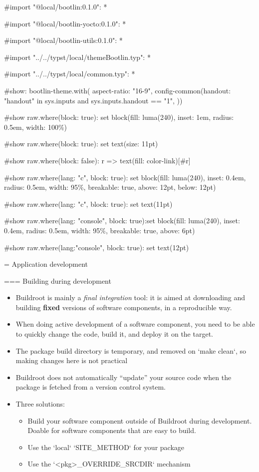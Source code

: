 
#import "@local/bootlin:0.1.0": *

#import "@local/bootlin-yocto:0.1.0": *

#import "@local/bootlin-utils:0.1.0": *

#import "../../typst/local/themeBootlin.typ": *

#import "../../typst/local/common.typ": *

#show: bootlin-theme.with( aspect-ratio: "16-9", config-common(handout: "handout" in sys.inputs and sys.inputs.handout == "1", ))

#show raw.where(block: true): set block(fill: luma(240), inset: 1em, radius: 0.5em, width: 100\%)

#show raw.where(block: true): set text(size: 11pt)

#show raw.where(block: false): r => text(fill: color-link)[#r]

#show raw.where(lang: "c", block: true): set block(fill: luma(240), inset: 0.4em, radius: 0.5em, width: 95\%, breakable: true, above: 12pt, below: 12pt)

#show raw.where(lang: "c", block: true): set text(11pt)

#show raw.where(lang: "console", block: true):set block(fill: luma(240), inset: 0.4em, radius: 0.5em, width: 95\%, breakable: true, above: 6pt)

#show raw.where(lang:"console", block: true): set text(12pt)

 = Application development

=== {Building during development}
  \begin{itemize}
  \item Buildroot is mainly a {\em final integration} tool: it is
    aimed at downloading and building {\bf fixed} versions of software
    components, in a reproducible way.
  \item When doing active development of a software component, you
    need to be able to quickly change the code, build it, and deploy
    it on the target.
  \item The package build directory is temporary, and removed on
    `make clean`, so making changes here is not practical
  \item Buildroot does not automatically ``update'' your source code
    when the package is fetched from a version control system.
  \item Three solutions:
    \begin{itemize}
    \item Build your software component outside of Buildroot during
      development. Doable for software components that are easy to
      build.
    \item Use the `local` `SITE_METHOD` for your package
    \item Use the `<pkg>_OVERRIDE_SRCDIR` mechanism
    \end{itemize}
  \end{itemize}



